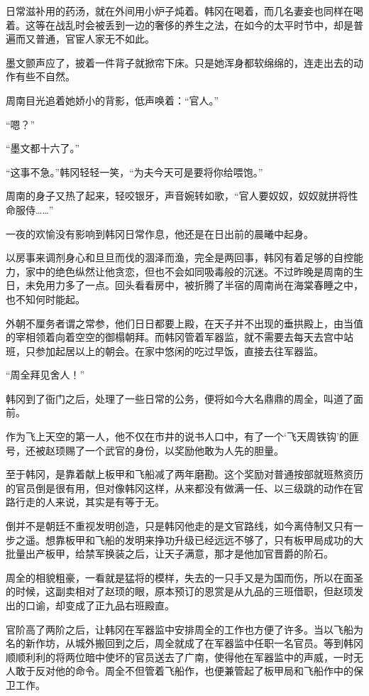 日常滋补用的药汤，就在外间用小炉子炖着。韩冈在喝着，而几名妻妾也同样在喝着。这等在战乱时会被丢到一边的奢侈的养生之法，在如今的太平时节中，却是普遍而又普通，官宦人家无不如此。

墨文颤声应了，披着一件背子就掀帘下床。只是她浑身都软绵绵的，连走出去的动作有些不自然。

周南目光追着她娇小的背影，低声唤着：“官人。”

“嗯？”

“墨文都十六了。”

“这事不急。”韩冈轻轻一笑，“为夫今天可是要将你给喂饱。”

周南的身子又热了起来，轻咬银牙，声音婉转如歌，“官人要奴奴，奴奴就拼将性命服侍……”

一夜的欢愉没有影响到韩冈日常作息，他还是在日出前的晨曦中起身。

以房事来调剂身心和旦旦而伐的涸泽而渔，完全是两回事，韩冈有着足够的自控能力，家中的绝色纵然让他贪恋，但也不会如同吸毒般的沉迷。不过昨晚是周南的生日，未免用力多了一点。回头看看房中，被折腾了半宿的周南尚在海棠春睡之中，也不知何时能起。

外朝不厘务者谓之常参，他们日日都要上殿，在天子并不出现的垂拱殿上，由当值的宰相领着向着空空的御榻朝拜。而韩冈管着军器监，就不需要去每天去宫中站班，只参加起居以上的朝会。在家中悠闲的吃过早饭，直接去往军器监。

“周全拜见舍人！”

韩冈到了衙门之后，处理了一些日常的公务，便将如今大名鼎鼎的周全，叫道了面前。

作为飞上天空的第一人，他不仅在市井的说书人口中，有了一个‘飞天周铁钩’的匪号，还被赵顼赐了一个武官的身份，以奖励他敢为人先的胆量。

至于韩冈，是靠着献上板甲和飞船减了两年磨勘。这个奖励对普通按部就班熬资历的官员倒是很有用，但对像韩冈这样，从来都没有做满一任、以三级跳的动作在官路行走的人来说，其实是有等于无。

倒并不是朝廷不重视发明创造，只是韩冈他走的是文官路线，如今离侍制又只有一步之遥。想靠板甲和飞船的发明来挣功升级已经远远不够了，只有板甲局成功的大批量出产板甲，给禁军换装之后，让天子满意，那才是他加官晋爵的阶石。

周全的相貌粗豪，一看就是猛将的模样，失去的一只手又是为国而伤，所以在面圣的时候，这副卖相对了赵顼的眼，原本预订的恩赏是从九品的三班借职，但赵顼发出的口谕，却变成了正九品右班殿直。

官阶高了两阶之后，让韩冈在军器监中安排周全的工作也方便了许多。当以飞船为名的新作坊，从城外搬回到之后，周全就成了在军器监中任职一名官员。等到韩冈顺顺利利的将两位暗中使坏的官员送去了广南，使得他在军器监中的声威，一时无人敢于反对他的命令。周全不但管着飞船作，也便兼管起了板甲局和飞船作中的保卫工作。

